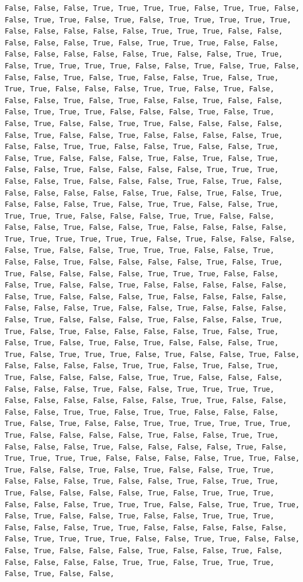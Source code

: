 \documentclass[
  letterpaper,
  DIV=11,
  numbers=noendperiod]{scrartcl}
\begin{document}
\begin{verbatim}
False, False, False, True, True, True, True, False, True, True, False, False, True, True, False, True, False, True, True, True, True, True, False, False, False, False, False, True, True, True, False, False, False, False, False, True, False, True, True, True, False, False, False, False, False, False, False, True, False, False, True, True, False, True, True, True, True, False, False, True, False, True, False, False, False, True, False, True, False, False, True, False, True, True, True, False, False, False, True, True, False, True, False, False, False, True, False, True, False, False, True, False, False, False, True, True, True, False, False, False, True, False, True, False, True, False, False, True, True, False, False, False, False, False, True, False, False, True, False, False, False, False, True, False, False, True, True, False, False, True, False, False, True, False, True, False, False, False, True, False, True, False, True, False, False, True, False, False, False, False, True, True, True, False, False, True, False, False, False, True, False, True, False, False, False, False, False, False, True, False, True, False, True, False, False, False, True, False, True, True, False, False, True, True, True, True, False, False, False, True, True, False, False, False, False, True, False, False, True, False, False, False, False, True, True, True, True, True, True, False, True, False, False, False, False, True, False, False, True, True, True, False, False, True, False, False, True, False, False, False, False, True, False, True, True, False, False, False, False, True, True, True, False, False, False, True, False, False, True, False, False, False, False, False, False, True, False, False, False, True, False, False, False, False, False, False, False, True, False, False, True, False, False, False, False, True, False, False, False, True, False, False, False, True, True, False, True, False, False, False, False, True, False, True, False, True, False, True, False, True, False, False, False, True, True, False, True, True, True, False, True, False, False, True, False, False, False, False, False, True, True, False, True, False, True, True, False, False, False, False, True, True, False, False, False, False, False, False, True, False, False, True, True, True, True, False, False, False, False, False, False, True, True, False, False, False, False, True, True, False, True, True, False, False, False, True, False, True, False, False, True, True, True, True, True, True, True, False, False, False, False, True, False, False, True, True, False, False, False, True, False, False, False, False, True, False, True, True, True, True, False, False, False, False, True, True, False, True, False, False, True, False, True, False, False, True, True, False, False, False, True, False, False, True, False, True, True, True, False, False, False, False, True, False, True, True, True, False, False, False, True, True, True, False, False, True, True, True, False, True, False, False, True, False, False, True, True, True, False, False, False, True, True, False, False, False, False, False, False, True, True, True, True, False, False, True, True, False, False, False, True, False, False, False, True, False, False, True, False, False, False, False, False, True, True, False, True, True, True, False, True, False, False, 
\end{verbatim}
\end{document}
